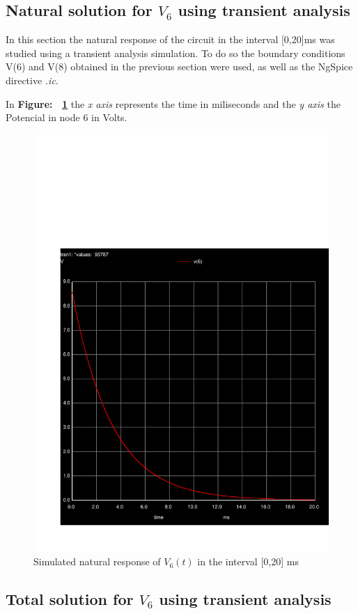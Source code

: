 \pagebreak
 
\subsection{ Natural solution for $V_6$ using transient analysis}
In this section the natural response of the circuit in the interval [0,20]ms was studied using a transient analysis simulation. To do so the boundary conditions V(6) and V(8) obtained in the previous section were used, as well as the NgSpice directive \textit{.ic}.  
\par
In \textbf{Figure: ~\ref{fig:transient}} the \textit{x axis} represents the time in miliseconds and the \textit{y axis} the Potencial in node 6  in Volts.  
\begin{figure}[h] \centering
\includegraphics[width=0.6\linewidth]{trans.pdf}
\caption{Simulated natural response of $V_6(t)$ in the interval [0,20] ms  }
\label{fig:transient}
\end{figure}

\pagebreak
\subsection{ Total solution for $V_6$ using transient analysis}

